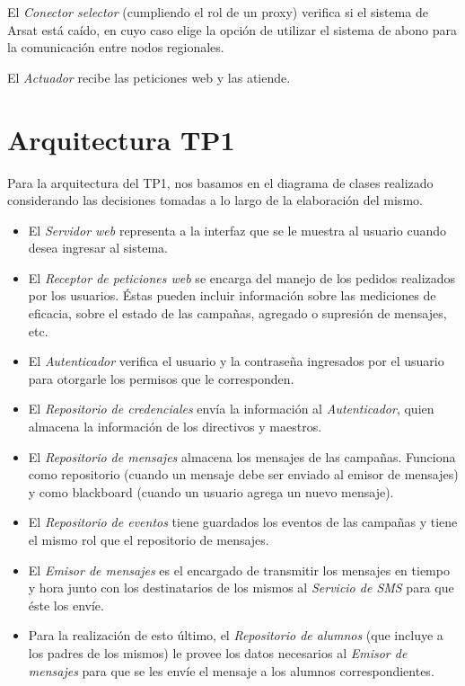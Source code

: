 \documentclass[a4paper, 10pt, twoside]{article}
\begin{document}
El \textit{Conector selector} (cumpliendo el rol de un proxy) verifica si el sistema de Arsat está caído, en cuyo caso elige la opción de utilizar el sistema de abono para la comunicación entre nodos regionales.

El \textit{Actuador} recibe las peticiones web y las atiende.


\newpage
\section{Arquitectura TP1}

Para la arquitectura del TP1, nos basamos en el diagrama de clases realizado considerando las decisiones tomadas a lo largo de la elaboración del mismo.

\begin{itemize}
\item El \textit{Servidor web} representa a la interfaz que se le muestra al usuario cuando desea ingresar al sistema.
\item El \textit{Receptor de peticiones web} se encarga del manejo de los pedidos realizados por los usuarios. Éstas pueden incluir información sobre las mediciones de eficacia, sobre el estado de las campañas, agregado o supresión de mensajes, etc.
\item El \textit{Autenticador} verifica el usuario y la contraseña ingresados por el usuario para otorgarle los permisos que le corresponden.
\item El \textit{Repositorio de credenciales} envía la información al \textit{Autenticador}, quien almacena la información de los directivos y maestros.
\item El \textit{Repositorio de mensajes} almacena los mensajes de las campañas. Funciona como repositorio (cuando un mensaje debe ser enviado al emisor de mensajes) y como blackboard (cuando un usuario agrega un nuevo mensaje).
\item El \textit{Repositorio de eventos} tiene guardados los eventos de las campañas y tiene el mismo rol que el repositorio de mensajes.
\item El \textit{Emisor de mensajes} es el encargado de transmitir los mensajes en tiempo y hora junto con los destinatarios de los mismos al \textit{Servicio de SMS} para que éste los envíe.
\item Para la realización de esto último, el \textit{Repositorio de alumnos} (que incluye a los padres de los mismos) le provee los datos necesarios al \textit{Emisor de mensajes} para que se les envíe el mensaje a los alumnos correspondientes.
\end{itemize}
\end{document}
